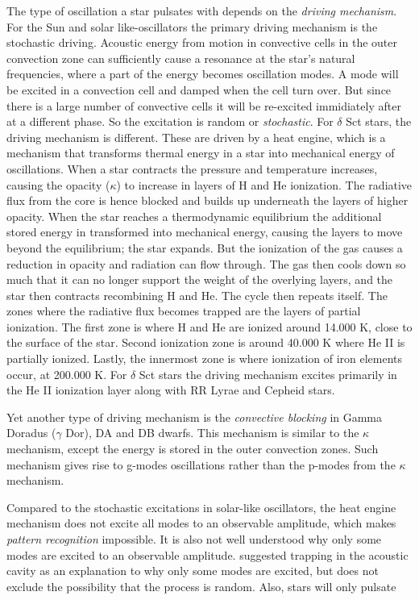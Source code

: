 The type of oscillation a star pulsates with depends on the \textit{driving mechanism}. For the Sun and solar like-oscillators the primary driving mechanism is the stochastic driving. Acoustic energy from motion in convective cells in the outer convection zone can sufficiently cause a resonance at the star's natural frequencies, where a part of the energy becomes oscillation modes. A mode will be excited in a convection cell and damped when the cell turn over. But since there is a large number of convective cells it will be re-excited immidiately after at a different phase. So the excitation is random or \textit{stochastic}. 
For $\delta$ Sct stars, the driving mechanism is different. These are driven by a heat engine, which is a mechanism that transforms thermal energy in a star into mechanical energy of oscillations. When a star contracts the pressure and temperature increases, causing the opacity ($\kappa$) to increase in layers of H and He ionization. The radiative flux from the core is hence blocked and builds up underneath the layers of higher opacity. When the star reaches a thermodynamic equilibrium the additional stored energy in transformed into mechanical energy, causing the layers to move beyond the equilibrium; the star expands. But the ionization of the gas causes a reduction in opacity and radiation can flow through. The gas then cools down so much that it can no longer support the weight of the overlying layers, and the star then contracts recombining H and He. The cycle then repeats itself. 
The zones where the radiative flux becomes trapped are the layers of partial ionization. The first zone is where H and He are ionized around 14.000 K, close to the surface of the star. Second ionization zone is around 40.000 K where He II is partially ionized. Lastly, the innermost zone is where ionization of iron elements occur, at 200.000 K. For $\delta$ Sct stars the driving mechanism excites primarily in the He II ionization layer along with RR Lyrae and Cepheid stars. 

Yet another type of driving mechanism is the \textit{convective blocking} in Gamma Doradus ($\gamma$ Dor), DA and DB dwarfs. This mechanism is similar to the $\kappa$ mechanism, except the energy is stored in the outer convection zones. Such mechanism gives rise to g-modes oscillations rather than the p-modes from the $\kappa$ mechanism. 

Compared to the stochastic excitations in solar-like oscillators, the heat engine mechanism does not excite all modes to an observable amplitude, which makes \textit{pattern recognition} impossible. It is also not well understood why only some modes are excited to an observable amplitude. 
\citep{dziembowski1990} suggested trapping in the acoustic cavity as an explanation to why only some modes are excited, but does not exclude the possibility that the process is random. Also, stars will only pulsate 

